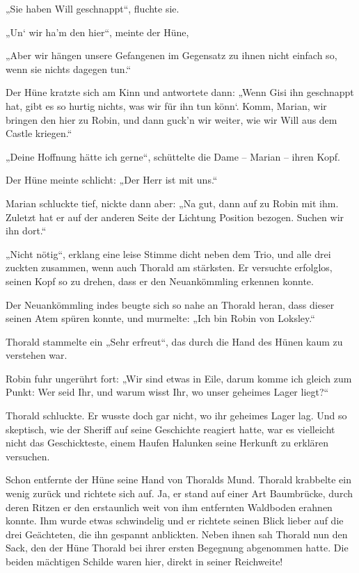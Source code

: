 \documentclass[10pt, a4paper, oneside]{book}
\begin{document}
„Sie haben Will geschnappt“, fluchte sie.

„Un‘ wir ha’m den hier“, meinte der Hüne,

„Aber wir hängen unsere Gefangenen im Gegensatz zu ihnen nicht einfach so, wenn sie nichts dagegen tun.“

Der Hüne kratzte sich am Kinn und antwortete dann: „Wenn Gisi ihn geschnappt hat, gibt es so hurtig nichts, was wir für ihn tun könn‘. Komm, Marian, wir bringen den hier zu Robin, und dann guck’n wir weiter, wie wir Will aus dem Castle kriegen.“

„Deine Hoffnung hätte ich gerne“, schüttelte die Dame – Marian – ihren Kopf.

Der Hüne meinte schlicht: „Der Herr ist mit uns.“

Marian schluckte tief, nickte dann aber: „Na gut, dann auf zu Robin mit ihm. Zuletzt hat er auf der anderen Seite der Lichtung Position bezogen. Suchen wir ihn dort.“

„Nicht nötig“, erklang eine leise Stimme dicht neben dem Trio, und alle drei zuckten zusammen, wenn auch Thorald am stärksten. Er versuchte erfolglos, seinen Kopf so zu drehen, dass er den Neuankömmling erkennen konnte.

Der Neuankömmling indes beugte sich so nahe an Thorald heran, dass dieser seinen Atem spüren konnte, und murmelte: „Ich bin Robin von Loksley.“

Thorald stammelte ein „Sehr erfreut“, das durch die Hand des Hünen kaum zu verstehen war.

Robin fuhr ungerührt fort: „Wir sind etwas in Eile, darum komme ich gleich zum Punkt: Wer seid Ihr, und warum wisst Ihr, wo unser geheimes Lager liegt?“

Thorald schluckte. Er wusste doch gar nicht, wo ihr geheimes Lager lag. Und so skeptisch, wie der Sheriff auf seine Geschichte reagiert hatte, war es vielleicht nicht das Geschickteste, einem Haufen Halunken seine Herkunft zu erklären versuchen.

Schon entfernte der Hüne seine Hand von Thoralds Mund. Thorald krabbelte ein wenig zurück und richtete sich auf. Ja, er stand auf einer Art Baumbrücke, durch deren Ritzen er den erstaunlich weit von ihm entfernten Waldboden erahnen konnte. Ihm wurde etwas schwindelig und er richtete seinen Blick lieber auf die drei Geächteten, die ihn gespannt anblickten. Neben ihnen sah Thorald nun den Sack, den der Hüne Thorald bei ihrer ersten Begegnung abgenommen hatte. Die beiden mächtigen Schilde waren hier, direkt in seiner Reichweite!
\end{document}

